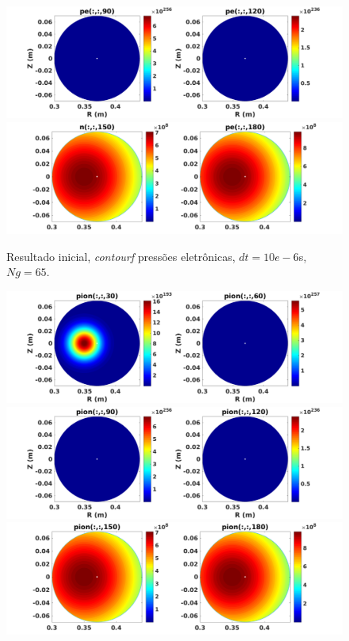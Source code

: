 \begin{frame}
\begin{figure}[H]
\begin{center}
\includegraphics[scale=0.5]{../SImulacao_breakdown/Adaptacao_nova/petod2.png} 
\includegraphics[scale=0.5]{../SImulacao_breakdown/Adaptacao_nova/petod3.png} 
\caption{Resultado inicial, \textit{contourf} pressões eletrônicas, $dt=10e-6$s, $Ng = 65$.}
\end{center}
\end{figure}
\begin{figure}[H]
\label{simul201}
\begin{center}
\includegraphics[scale=0.5]{../SImulacao_breakdown/Adaptacao_nova/pitod1.png}  
\includegraphics[scale=0.5]{../SImulacao_breakdown/Adaptacao_nova/pitod2.png} 
\includegraphics[scale=0.5]{../SImulacao_breakdown/Adaptacao_nova/pitod3.png} 

\end{center}
\end{figure}
\end{frame}
